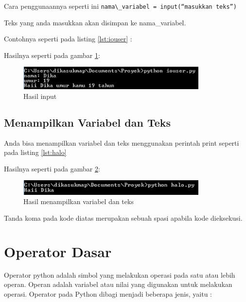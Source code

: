 Cara penggunaannya seperti ini \verb|nama\_variabel = input(“masukkan teks”)|

Teks yang anda masukkan akan disimpan ke nama\_variabel.

Contohnya seperti pada listing \ref{lst:iouser} :


Hasilnya seperti pada gambar \ref{fig:hasilinput}:
\begin{figure}[!htbp]
	\centerline{\includegraphics[width=0.85\textwidth]{figures/2/hasilinput.PNG}}
	\caption{Hasil input}
	\label{fig:hasilinput}
\end{figure}

\subsection{Menampilkan Variabel dan Teks}
Anda bisa menampilkan variabel dan teks menggunakan perintah print seperti pada listing \ref{lst:halo}


Hasilnya seperti pada gambar \ref{fig:showvar}:
\begin{figure}[!htbp]
	\centerline{\includegraphics[width=0.85\textwidth]{figures/2/showvar.PNG}}
	\caption{Hasil menampilkan variabel dan teks}
	\label{fig:showvar}
\end{figure}

Tanda koma pada kode diatas merupakan sebuah spasi apabila kode dieksekusi.

\section{Operator Dasar}
Operator python adalah simbol yang melakukan operasi pada satu atau lebih operan. Operan adalah variabel atau nilai yang digunakan untuk melakukan operasi.
Operator pada Python dibagi menjadi beberapa jenis, yaitu :

